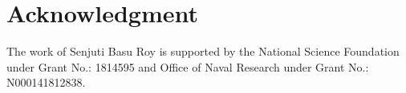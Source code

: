 \documentclass[11pt]{article}
\begin{document}
\section{Acknowledgment}
\vspace{-0.1in}
The work of Senjuti Basu Roy is supported by the National Science
Foundation under Grant No.: 1814595 and Office of Naval Research
under Grant No.: N000141812838. 



\vspace{-0.2in}

%

\end{document}
